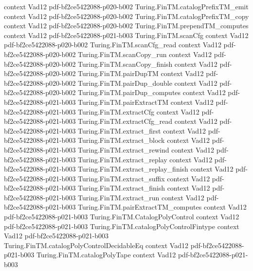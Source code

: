 \begin{theorem}
  {context}
  {Vad12}
  {pdf-bf2ce5422088-p020-b002}
\proofstep
  {Turing.FinTM.catalogPrefixTM_emit}
  {context}
  {Vad12}
  {pdf-bf2ce5422088-p020-b002}
\proofstep
  {Turing.FinTM.catalogPrefixTM_copy}
  {context}
  {Vad12}
  {pdf-bf2ce5422088-p020-b002}
\proofstep
  {Turing.FinTM.prependTM_computes}
  {context}
  {Vad12}
  {pdf-bf2ce5422088-p021-b003}
\proofstep
  {Turing.FinTM.scanCfg}
  {context}
  {Vad12}
  {pdf-bf2ce5422088-p020-b002}
\proofstep
  {Turing.FinTM.scanCfg_read}
  {context}
  {Vad12}
  {pdf-bf2ce5422088-p020-b002}
\proofstep
  {Turing.FinTM.scanCopy_run}
  {context}
  {Vad12}
  {pdf-bf2ce5422088-p020-b002}
\proofstep
  {Turing.FinTM.scanCopy_finish}
  {context}
  {Vad12}
  {pdf-bf2ce5422088-p020-b002}
\proofstep
  {Turing.FinTM.pairDupTM}
  {context}
  {Vad12}
  {pdf-bf2ce5422088-p020-b002}
\proofstep
  {Turing.FinTM.pairDup_double}
  {context}
  {Vad12}
  {pdf-bf2ce5422088-p020-b002}
\proofstep
  {Turing.FinTM.pairDup_computes}
  {context}
  {Vad12}
  {pdf-bf2ce5422088-p021-b003}
\proofstep
  {Turing.FinTM.pairExtractTM}
  {context}
  {Vad12}
  {pdf-bf2ce5422088-p021-b003}
\proofstep
  {Turing.FinTM.extractCfg}
  {context}
  {Vad12}
  {pdf-bf2ce5422088-p021-b003}
\proofstep
  {Turing.FinTM.extractCfg_read}
  {context}
  {Vad12}
  {pdf-bf2ce5422088-p021-b003}
\proofstep
  {Turing.FinTM.extract_first}
  {context}
  {Vad12}
  {pdf-bf2ce5422088-p021-b003}
\proofstep
  {Turing.FinTM.extract_block}
  {context}
  {Vad12}
  {pdf-bf2ce5422088-p021-b003}
\proofstep
  {Turing.FinTM.extract_rewind}
  {context}
  {Vad12}
  {pdf-bf2ce5422088-p021-b003}
\proofstep
  {Turing.FinTM.extract_replay}
  {context}
  {Vad12}
  {pdf-bf2ce5422088-p021-b003}
\proofstep
  {Turing.FinTM.extract_replay_finish}
  {context}
  {Vad12}
  {pdf-bf2ce5422088-p021-b003}
\proofstep
  {Turing.FinTM.extract_suffix}
  {context}
  {Vad12}
  {pdf-bf2ce5422088-p021-b003}
\proofstep
  {Turing.FinTM.extract_finish}
  {context}
  {Vad12}
  {pdf-bf2ce5422088-p021-b003}
\proofstep
  {Turing.FinTM.extract_run}
  {context}
  {Vad12}
  {pdf-bf2ce5422088-p021-b003}
\proofstep
  {Turing.FinTM.pairExtractTM_computes}
  {context}
  {Vad12}
  {pdf-bf2ce5422088-p021-b003}
\proofstep
  {Turing.FinTM.CatalogPolyControl}
  {context}
  {Vad12}
  {pdf-bf2ce5422088-p021-b003}
\proofstep
  {Turing.FinTM.catalogPolyControlFintype}
  {context}
  {Vad12}
  {pdf-bf2ce5422088-p021-b003}
\proofstep
  {Turing.FinTM.catalogPolyControlDecidableEq}
  {context}
  {Vad12}
  {pdf-bf2ce5422088-p021-b003}
\proofstep
  {Turing.FinTM.catalogPolyTape}
  {context}
  {Vad12}
  {pdf-bf2ce5422088-p021-b003}
\proofstep

\end{theorem}
